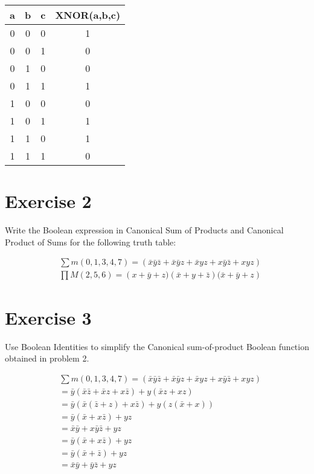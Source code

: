 \documentclass{article}
\begin{document}
    \begin{center}
        \begin{tabular}{|c|c|c|c|}
            \hline
            a & b & c & XNOR(a,b,c) \\
            \hline
            0 & 0 & 0 & 1 \\
            0 & 0 & 1 & 0 \\
            0 & 1 & 0 & 0 \\
            0 & 1 & 1 & 1 \\
            1 & 0 & 0 & 0 \\
            1 & 0 & 1 & 1 \\
            1 & 1 & 0 & 1 \\
            1 & 1 & 1 & 0 \\
            \hline
        \end{tabular}
    \end{center}

    \newpage
    \section{Exercise 2}
    \begin{flushleft}
        Write the Boolean expression in Canonical Sum of Products and Canonical Product of Sums for the following truth table:
    \end{flushleft}
    \begin{align*}
        &\sum m \left(0, 1, 3, 4, 7 \right) = \left(\bar{x}\bar{y}\bar{z} + \bar{x}\bar{y}z + \bar{x}yz + x\bar{y}\bar{z} + xyz\right) \\
        &\prod M \left(2, 5, 6 \right) = \left(x+\bar{y}+z)(\bar{x}+y+\bar{z})(\bar{x}+\bar{y}+z\right)
    \end{align*}
    \section{Exercise 3}
    \begin{flushleft}
        Use Boolean Identities to simplify the Canonical sum-of-product Boolean function
        obtained in problem 2.
    \end{flushleft}
    \begin{align*}
        &\sum m \left(0, 1, 3, 4, 7 \right) = \left(\bar{x}\bar{y}\bar{z} + \bar{x}\bar{y}z + \bar{x}yz + x\bar{y}\bar{z} + xyz\right) \\
        &= \bar{y}(\bar{x}\bar{z} + \bar{x}z + x\bar{z}) + y(\bar{x}z + xz) \\
        &= \bar{y}(\bar{x}(\bar{z}+ z) + x\bar{z}) + y(z(\bar{x} + x)) \\
        &= \bar{y}(\bar{x} + x\bar{z}) + yz \\
        &= \bar{x}\bar{y} + x\bar{y}\bar{z} + yz \\
        &= \bar{y}(\bar{x} + x\bar{z}) + yz \\
        &= \bar{y}(\bar{x} + \bar{z}) + yz \\
        &= \bar{x}\bar{y} + \bar{y}\bar{z} + yz \\
    \end{align*}
\end{document}
